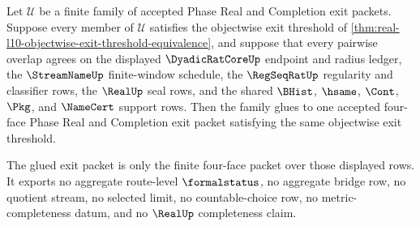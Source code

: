 \begin{theorem}
\label{thm:real-l10-finite-cover-exit-threshold-gluing}
Let $\mathcal{U}$ be a finite family of accepted Phase Real and Completion
exit packets. Suppose every member of $\mathcal{U}$ satisfies the objectwise
exit threshold of
\autoref{thm:real-l10-objectwise-exit-threshold-equivalence}, and suppose
that every pairwise overlap agrees on the displayed $\DyadicRatCoreUp$
endpoint and radius ledger, the $\StreamNameUp$ finite-window schedule, the
$\RegSeqRatUp$ regularity and classifier rows, the $\RealUp$ seal rows, and
the shared $\BHist$, $\hsame$, $\Cont$, $\Pkg$, and $\NameCert$ support rows.
Then the family glues to one accepted four-face Phase Real and Completion
exit packet satisfying the same objectwise exit threshold.

The glued exit packet is only the finite four-face packet over those displayed
rows. It exports no aggregate route-level $\formalstatus$, no aggregate bridge
row, no quotient stream, no selected limit, no countable-choice row, no
metric-completeness datum, and no $\RealUp$ completeness claim.
\end{theorem}
